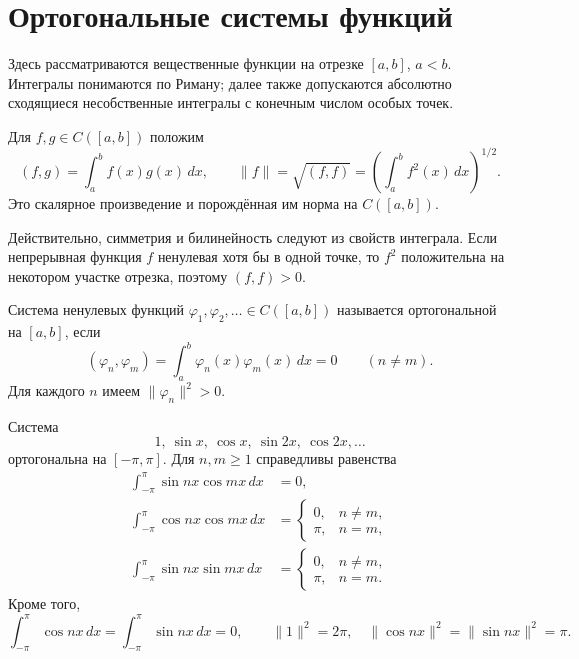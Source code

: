 \section{Ортогональные системы функций}\label{sec-fourier-orthogonal}

Здесь рассматриваются вещественные функции на отрезке \([a,b]\), \(a<b\). Интегралы понимаются по Риману; далее также допускаются абсолютно сходящиеся несобственные интегралы с конечным числом особых точек.

\begin{definition}\label{def-function-inner-product}

Для \(f,g\in C([a,b])\) положим
\begin{equation}
(f,g)=\int_a^b f(x)g(x)\,dx,
\qquad
\|f\|=\sqrt{(f,f)}=\left(\int_a^b f^2(x)\,dx\right)^{1/2}.
\label{eq-function-inner-product}
\end{equation}
Это скалярное произведение и порождённая им норма на \(C([a,b])\).

\end{definition}

Действительно, симметрия и билинейность следуют из свойств интеграла. Если непрерывная функция \(f\) ненулевая хотя бы в одной точке, то \(f^2\) положительна на некотором участке отрезка, поэтому \((f,f)>0\).

\begin{definition}\label{def-orthogonal-system}

Система ненулевых функций \(\varphi_1,\varphi_2,\ldots\in C([a,b])\) называется ортогональной на \([a,b]\), если
\[
(\varphi_n,\varphi_m)=\int_a^b\varphi_n(x)\varphi_m(x)\,dx=0
\qquad(n\ne m).
\]
Для каждого \(n\) имеем \(\|\varphi_n\|^2>0\).

\end{definition}

\begin{example}\label{exm-trigonometric-system}

Система
\[
1,\ \sin x,\ \cos x,\ \sin 2x,\ \cos 2x,\ldots
\]
ортогональна на \([-\pi,\pi]\). Для \(n,m\ge1\) справедливы равенства
\begin{equation}
\begin{aligned}
\int_{-\pi}^{\pi}\sin nx\cos mx\,dx&=0,\\
\int_{-\pi}^{\pi}\cos nx\cos mx\,dx
&=\begin{cases}0,&n\ne m,\\ \pi,&n=m,\end{cases}\\
\int_{-\pi}^{\pi}\sin nx\sin mx\,dx
&=\begin{cases}0,&n\ne m,\\ \pi,&n=m.\end{cases}
\end{aligned}
\label{eq-trigonometric-orthogonality}
\end{equation}
Кроме того,
\[
\int_{-\pi}^{\pi}\cos nx\,dx
=\int_{-\pi}^{\pi}\sin nx\,dx=0,
\qquad
\|1\|^2=2\pi,\quad
\|\cos nx\|^2=\|\sin nx\|^2=\pi.
\]

\end{example}

